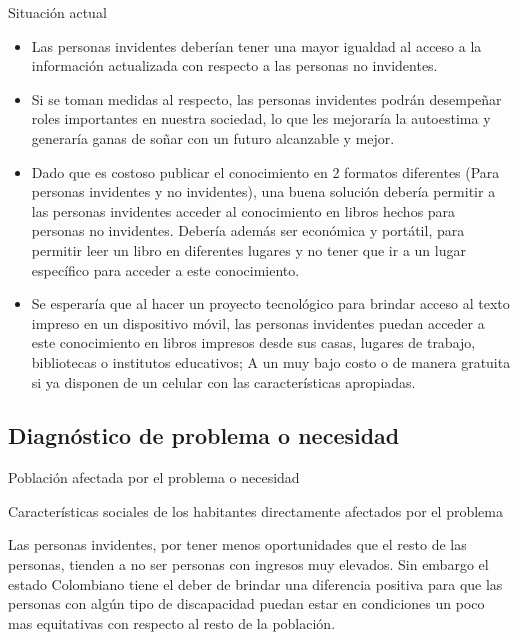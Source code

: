 \documentclass[a4paper, 12pt, oneside]{article}
\begin{document}
	Situación actual
	\begin{itemize}
	\item Las personas invidentes deberían tener una mayor igualdad al acceso a la información actualizada con respecto a las personas no invidentes.
	\item Si se toman medidas al respecto, las personas invidentes podrán
desempeñar roles importantes en nuestra sociedad, lo que les mejoraría la autoestima y generaría ganas de soñar con un futuro alcanzable y mejor.
	\item Dado que es costoso publicar el conocimiento en 2 formatos diferentes (Para personas invidentes y no invidentes), una buena solución debería permitir a las personas invidentes acceder al conocimiento en libros hechos para personas no invidentes. Debería además ser económica y portátil, para permitir leer un libro en diferentes lugares y no tener que ir a un lugar específico para acceder a este conocimiento.
	\item Se esperaría que al hacer un proyecto tecnológico para brindar acceso al texto impreso en un dispositivo móvil, las personas invidentes puedan acceder a este conocimiento en libros impresos desde sus casas, lugares de trabajo, bibliotecas o institutos educativos; A un muy bajo costo o de manera gratuita si ya disponen de un celular con las características apropiadas.
	\end{itemize}

	\clearpage

	\begin{center}
	\section{Diagnóstico de problema o necesidad}
	\end{center}

	Población afectada por el problema o necesidad


	Características sociales de los habitantes directamente afectados por el problema

Las personas invidentes, por tener menos oportunidades que el resto de las personas, tienden a no ser personas con ingresos muy elevados. Sin embargo el estado Colombiano tiene el deber de brindar una diferencia positiva para que las personas con algún tipo de discapacidad puedan estar en condiciones un poco mas equitativas con respecto al resto de la población.

\end{document}
